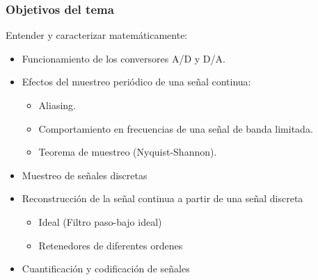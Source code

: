 \begin{frame}\frametitle{Objetivos del tema}
  Entender y caracterizar matemáticamente:
  \begin{itemize}
    \small
    \item Funcionamiento de los conversores A/D y D/A.
    \item Efectos del muestreo periódico de una señal continua:
    \begin{itemize}
      \footnotesize
      \item Aliasing.
      \item Comportamiento en frecuencias de una señal de banda limitada.
      \item Teorema de muestreo (Nyquist-Shannon).
    \end{itemize}
    \item Muestreo de señales discretas
    \item Reconstrucción de la señal continua a partir de una señal discreta
    \begin{itemize}
      \footnotesize
      \item Ideal (Filtro paso-bajo ideal)
      \item Retenedores de diferentes ordenes
    \end{itemize}
    \item Cuantificación y codificación de señales
  \end{itemize}
\end{frame}